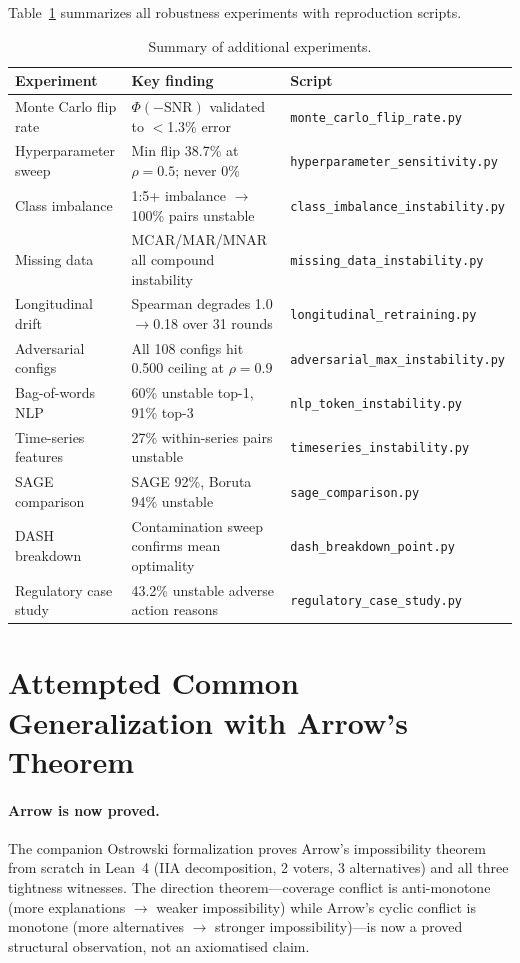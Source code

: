 \documentclass{article}
\begin{document}
Table~\ref{tab:experiment-summary-def} summarizes all robustness experiments with reproduction scripts.

\begin{table}[t]
\centering
\caption{Summary of additional experiments.}
\label{tab:experiment-summary-def}
\small
\begin{tabular}{@{}lll@{}}
\toprule
Experiment & Key finding & Script \\
\midrule
Monte Carlo flip rate & $\Phi(-\text{SNR})$ validated to $<$1.3\% error & \texttt{monte\_carlo\_flip\_rate.py} \\
Hyperparameter sweep & Min flip 38.7\% at $\rho{=}0.5$; never 0\% & \texttt{hyperparameter\_sensitivity.py} \\
Class imbalance & 1:5+ imbalance $\to$ 100\% pairs unstable & \texttt{class\_imbalance\_instability.py} \\
Missing data & MCAR/MAR/MNAR all compound instability & \texttt{missing\_data\_instability.py} \\
Longitudinal drift & Spearman degrades 1.0$\to$0.18 over 31 rounds & \texttt{longitudinal\_retraining.py} \\
Adversarial configs & All 108 configs hit 0.500 ceiling at $\rho{=}0.9$ & \texttt{adversarial\_max\_instability.py} \\
Bag-of-words NLP & 60\% unstable top-1, 91\% top-3 & \texttt{nlp\_token\_instability.py} \\
Time-series features & 27\% within-series pairs unstable & \texttt{timeseries\_instability.py} \\
SAGE comparison & SAGE 92\%, Boruta 94\% unstable & \texttt{sage\_comparison.py} \\
DASH breakdown & Contamination sweep confirms mean optimality & \texttt{dash\_breakdown\_point.py} \\
Regulatory case study & 43.2\% unstable adverse action reasons & \texttt{regulatory\_case\_study.py} \\
\bottomrule
\end{tabular}
\end{table}

\section{Attempted Common Generalization with Arrow's Theorem}
\label{sec:arrow-generalization}

\paragraph{Arrow is now proved.}
The companion Ostrowski formalization proves Arrow's impossibility theorem from scratch in Lean~4 (IIA decomposition, 2 voters, 3 alternatives) and all three tightness witnesses. The direction theorem---coverage conflict is anti-monotone (more explanations $\to$ weaker impossibility) while Arrow's cyclic conflict is monotone (more alternatives $\to$ stronger impossibility)---is now a proved structural observation, not an axiomatised claim.
\end{document}
